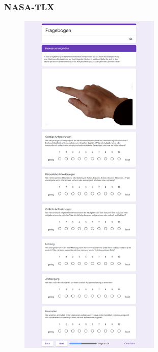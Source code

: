 \subsubsection{NASA-TLX}
\begin{figure}[!h]
\centering
\includegraphics[width=0.6\textwidth]{figures/Appendix/nasa tlx.png}
\end{figure}

